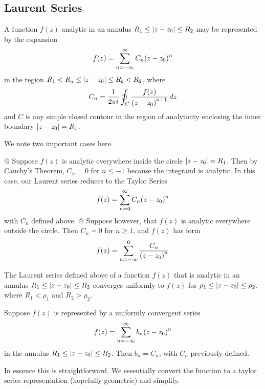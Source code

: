     \subsection{Laurent Series}
    \begin{thm}
        A function $f(z)$ analytic in an annulus $R_1\le\left\lvert z-z_0 \right\rvert\le R_2$
        may be represented by the expansion
        \begin{align*}
            f(z) = \sum_{n=-\infty}^\infty C_n {\left( z - z_0 \right)}^n
        \end{align*}
        in the region $R_1 < R_a \le \left\lvert z-z_0 \right\rvert \le R_b < R_2$, where
        \begin{align*}
            C_n = \frac{1}{2\pi i}
            \oint_C \frac{f(z)}{{\left( z-z_0 \right)}^{n+1}}\,dz
        \end{align*}
        and $C$ is any simple closed contour in the region of analyticity
        enclosing the inner boundary $\left\lvert z-z_0 \right\rvert = R_1$.
    \end{thm}
    We note two important cases here.
    \begin{easylist}[enumerate]
        @ Suppose $f(z)$ is analytic everywhere inside the circle
        $\left\lvert z-z_0 \right\rvert=R_1$. Then by Cauchy's Theorem, $C_n=0$ for $n\le-1$
        because the integrand is analytic. In this case, our Laurent series
        reduces to the Taylor Series
        \begin{align*}
            f(z)=\sum_{n=0}^\infty C_n {\left( z-z_0 \right)}^n
        \end{align*}
        with $C_n$ defined above.
        @ Suppose however, that $f(z)$ is analytic everywhere outside the
        circle. Then $C_n=0$ for $n\ge1$, and $f(z)$ has form
        \begin{align*}
            f(z) = \sum_{n=-\infty}^0 \frac{C_n}{{\left( z-z_0 \right)}^n}
        \end{align*}
    \end{easylist}
    \begin{thm}
        The Laurent series defined above of a function $f(z)$ that is
        analytic in an annulus $R_1\le\left\lvert z-z_0 \right\rvert\le R_2$ converges
        uniformly to $f(z)$ for $\rho_1 \le \left\lvert z-z_0 \right\rvert \le \rho_2$, where
        $R_1 < \rho_1$ and $R_2 > \rho_2$.
    \end{thm}
    \begin{thm}
        Suppose $f(z)$ is represented by a uniformly convergent series
        \begin{align*}
            f(z)=\sum_{n=-\infty}^\infty b_n{\left( z-z_0 \right)}^n
        \end{align*}
        in the annulus $R_1 \le \left\lvert z-z_0 \right\rvert \le R_2$. Then $b_n = C_n$, with
        $C_n$ previously defined.
    \end{thm}
    In essence this is straightforward. We essentially convert the function
    to a taylor series representation (hopefully geometric) and simplify.

